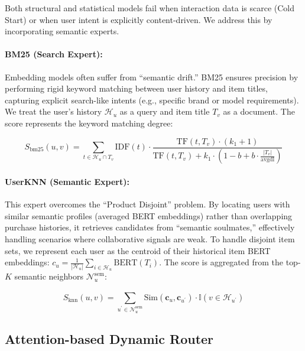Both structural and statistical models fail when interaction data is scarce (Cold Start) or when user intent is explicitly content-driven. We address this by incorporating semantic experts.

\paragraph{BM25 (Search Expert):} Embedding models often suffer from ``semantic drift.'' BM25 ensures precision by performing rigid keyword matching between user history and item titles, capturing explicit search-like intents (e.g., specific brand or model requirements). We treat the user's history $\mathcal{H}_{u}$ as a query and item title $T_{v}$ as a document. The score represents the keyword matching degree:

\begin{equation}
S_{\mathrm{bm25}}\left( u,v \right) = \sum_{t \in \mathcal{H}_{u} \cap T_{v}}^{}\mathrm{IDF}\left( t \right) \cdot \frac{\mathrm{TF}\left( t,T_{v} \right) \cdot \left( k_{1} + 1 \right)}{\mathrm{TF}\left( t,T_{v} \right) + k_{1} \cdot \left( 1 - b + b \cdot \frac{\left| T_{v} \right|}{\mathrm{avgdl}} \right)}
\end{equation}

\paragraph{UserKNN (Semantic Expert):} This expert overcomes the ``Product Disjoint'' problem. By locating users with similar semantic profiles (averaged BERT embeddings) rather than overlapping purchase histories, it retrieves candidates from ``semantic soulmates,'' effectively handling scenarios where collaborative signals are weak. To handle disjoint item sets, we represent each user as the centroid of their historical item BERT embeddings: $c_{u} = \frac{1}{\left| \mathcal{H}_{u} \right|}\sum_{i \in \mathcal{H}_{u}}^{}\mathrm{BERT}\left( T_{i} \right)$. The score is aggregated from the top-$K$ semantic neighbors $\mathcal{N}_{u}^{\mathrm{sem}}$:

\begin{equation}
S_{\mathrm{knn}}\left( u,v \right) = \sum_{u^{\prime} \in \mathcal{N}_{u}^{\mathrm{sem}}}^{}\mathrm{Sim}\left( \mathbf{c}_{u},\mathbf{c}_{u^{\prime}} \right) \cdot \mathbb{I}\left( v \in \mathcal{H}_{u^{\prime}} \right)
\end{equation}

\subsection{Attention-based Dynamic Router}
\label{subsec:attention_router}

